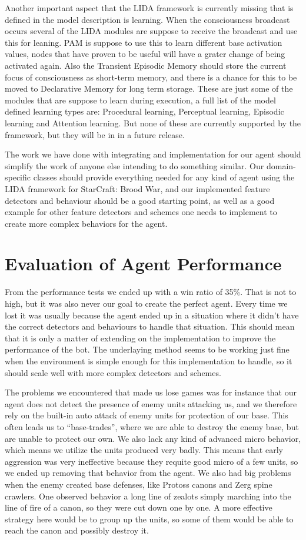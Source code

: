 Another important aspect that the LIDA framework is currently missing that is defined in the model description is learning. When the consciousness broadcast occurs several of the LIDA modules are suppose to receive the broadcast and use this for leaning. PAM is suppose to use this to learn different base activation values, nodes that have proven to be useful will have a grater change of being activated again. Also the Transient Episodic Memory should store the current focus of consciousness as short-term memory, and there is a chance for this to be moved to Declarative Memory for long term storage. These are just some of the modules that are suppose to learn during execution, a full list of the model defined learning types are: Procedural learning, Perceptual learning, Episodic learning and Attention learning. But none of these are currently supported by the framework, but they will be in in a future release.

The work we have done with integrating and  implementation for our agent should simplify the work of anyone else intending to do something similar. Our domain-specific classes should provide everything needed for any kind of agent using the LIDA framework for StarCraft: Brood War, and our implemented feature detectors and behaviour should be a good starting point, as well as a good example for other feature detectors and schemes one needs to implement to create more complex behaviors for the agent.

\section{Evaluation of Agent Performance}
From the performance tests we ended up with a win ratio of 35\%. That is not to high, but it was also never our goal to create the perfect agent. Every time we lost it was usually because the agent ended up in a situation where it didn't have the correct detectors and behaviours to handle that situation. This should mean that it is only a matter of extending on the implementation to improve the performance of the bot. The underlaying method seems to be working just fine when the environment is simple enough for this implementation to handle, so it should scale well with more complex detectors and schemes. 

The problems we encountered that made us lose games was for instance that our agent does not detect the presence of enemy units attacking us, and we therefore rely on the built-in auto attack of enemy units for protection of our base. This often leads us to ``base-trades'', where we are able to destroy the enemy base, but are unable to protect our own.
We also lack any kind of advanced micro behavior, which means we utilize the units produced very badly. This means that early aggression was very ineffective because they requite good micro of a few units, so we ended up removing that behavior from the agent. We also had big problems when the enemy created base defenses, like Protoss canons and Zerg spine crawlers. One observed behavior a long line of zealots simply marching into the line of fire of a canon, so they were cut down one by one. A more effective strategy here would be to group up the units, so some of them would be able to reach the canon and possibly destroy it.

